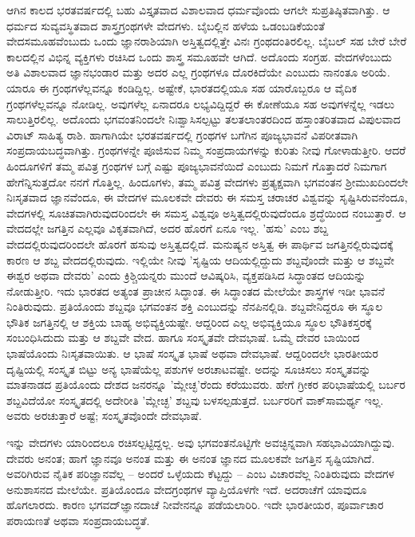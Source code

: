 ಆಗಿನ ಕಾಲದ ಭರತವರ್ಷದಲ್ಲಿ ಬಹು ವಿಸ್ತೃತವಾದ ವಿಶಾಲವಾದ ಧರ್ಮವೊಂದು ಆಗಲೇ ಸುಪ್ರತಿಷ್ಠಿತವಾಗಿತ್ತು. ಆ ಧರ್ಮದ ಸುವ್ಯವಸ್ಥಿತವಾದ ಶಾಸ್ತ್ರಗ್ರಂಥಗಳೇ ವೇದಗಳು. ಬೈಬಲ್ಲಿನ ಹಳೆಯ ಒಡಂಬಡಿಕೆಯಂತೆ ವೇದಸಮೂಹವೆಂಬುದು ಒಂದು ಜ್ಞಾನರಾಶಿಯಾಗಿ ಅಸ್ತಿತ್ವದಲ್ಲಿತ್ತೇ ವಿನಃ ಗ್ರಂಥದಂತಿರಲಿಲ್ಲ. ಬೈಬಲ್ ಸಹ ಬೇರೆ ಬೇರೆ ಕಾಲದಲ್ಲಿನ ವಿಭಿನ್ನ ವ್ಯಕ್ತಿಗಳು ರಚಿಸಿದ ಒಂದು ಶಾಸ್ತ್ರ ಸಮೂಹವೇ ಆಗಿದೆ. ಅದೊಂದು ಸಂಗ್ರಹ. ವೇದಗಳೆಂಬುದು ಅತಿ ವಿಶಾಲವಾದ ಜ್ಞಾನಭಂಡಾರ ಮತ್ತು ಅದರ ಎಲ್ಲ ಗ್ರಂಥಗಳೂ ದೊರಕಿದೆಯೇ ಎಂಬುದು ನಾನಂತೂ ಅರಿಯೆ. ಯಾರೂ ಈ ಗ್ರಂಥಗಳೆಲ್ಲವನ್ನೂ ಕಂಡಿದ್ದಿಲ್ಲ. ಅಷ್ಟೇಕೆ, ಭಾರತದಲ್ಲಿಯೂ ಸಹ ಯಾರೊಬ್ಬರೂ ಆ ವೈದಿಕ ಗ್ರಂಥಗಳೆಲ್ಲವನ್ನೂ ನೋಡಿಲ್ಲ. ಅವುಗಳೆಲ್ಲ ಏನಾದರೂ ಲಭ್ಯವಿದ್ದಿದ್ದರೆ ಈ ಕೋಣೆಯೂ ಸಹ ಅವುಗಳನ್ನೆಲ್ಲ ಇಡಲು ಸಾಲುತ್ತಿರಲಿಲ್ಲ. ಅದೊಂದು ಭಗವಂತನಿಂದಲೇ ನಿಃಶ್ವಾಸಿಸಲ್ಪಟ್ಟು ತಲತಲಾಂತರದಿಂದ ಹಸ್ತಾಂತರಿತವಾದ ವಿಪುಲವಾದ ವಿರಾಟ್ ಸಾಹಿತ್ಯ ರಾಶಿ. ಹಾಗಾಗಿಯೇ ಭರತವರ್ಷದಲ್ಲಿ ಗ್ರಂಥಗಳ ಬಗೆಗಿನ ಪೂಜ್ಯಭಾವನೆ ವಿಪರೀತವಾಗಿ ಸಂಪ್ರದಾಯಬದ್ಧವಾಗಿತ್ತು. ಗ್ರಂಥಗಳನ್ನೇ ಪೂಜಿಸುವ ನಿಮ್ಮ ಸಂಪ್ರದಾಯಗಳನ್ನು ಕುರಿತು ನೀವು ಗೋಳಾಡುತ್ತೀರಿ. ಆದರೆ ಹಿಂದೂಗಳಿಗೆ ತಮ್ಮ ಪವಿತ್ರ ಗ್ರಂಥಗಳ ಬಗ್ಗೆ ಎಷ್ಟು ಪೂಜ್ಯಭಾವನೆಯಿದೆ ಎಂಬುದು ನಿಮಗೆ ಗೊತ್ತಾದರೆ ನಿಮಗಾಗ ಹೇಗೆನ್ನಿಸುತ್ತದೋ ನನಗೆ ಗೊತ್ತಿಲ್ಲ. ಹಿಂದೂಗಳು, ತಮ್ಮ ಪವಿತ್ರ ವೇದಗಳು ಪ್ರತ್ಯಕ್ಷವಾಗಿ ಭಗವಂತನ ಶ‍್ರೀಮುಖದಿಂದಲೇ ನಿಃಸೃತವಾದ ಜ್ಞಾನವೆಂದೂ, ಈ ವೇದಗಳ ಮೂಲಕವೇ ದೇವರು ಈ ಸಮಸ್ತ ಚರಾಚರ ವಿಶ್ವವನ್ನು ಸೃಷ್ಟಿಸಿರುವನೆಂದೂ, ವೇದಗಳಲ್ಲಿ ಸೂಚಿತವಾಗಿರುವುದರಿಂದಲೇ ಈ ಸಮಸ್ತ ವಿಶ್ವವೂ ಅಸ್ತಿತ್ವದಲ್ಲಿರುವುದೆಂದೂ ಶ್ರದ್ಧೆಯಿಂದ ನಂಬುತ್ತಾರೆ. ಆ ವೇದದಲ್ಲೇ ಜಗತ್ತಿನ ಎಲ್ಲವೂ ವಿಕೃತವಾಗಿದೆ, ಅದರ ಹೊರಗೆ ಏನೂ ಇಲ್ಲ. 'ಹಸು' ಎಂಬ ಶಬ್ದ ವೇದದಲ್ಲಿರುವುದರಿಂದಲೇ ಹೊರಗೆ ಹಸುವು ಅಸ್ತಿತ್ವದಲ್ಲಿದೆ. ಮನುಷ್ಯನ ಅಸ್ತಿತ್ವ ಈ ಪಾರ್ಥಿವ ಜಗತ್ತಿನಲ್ಲಿರುವುದಕ್ಕೆ ಕಾರಣ ಆ ಶಬ್ದ ವೇದದಲ್ಲಿರುವುದು. ಇಲ್ಲಿಯೇ ನೀವು 'ಸೃಷ್ಟಿಯ ಆದಿಯಲ್ಲಿದ್ದುದು ಶಬ್ದವೊಂದೇ ಮತ್ತು ಆ ಶಬ್ದವೇ ಈಶ್ವರ ಅಥವಾ ದೇವರು' ಎಂದು ಕ್ರಿಶ್ಚಿಯನ್ನರು ಮುಂದೆ ಆವಿಷ್ಕರಿಸಿ, ವ್ಯಕ್ತಪಡಿಸಿದ ಸಿದ್ಧಾಂತದ ಆದಿಯನ್ನು ನೋಡುತ್ತೀರಿ. ಇದು ಭಾರತದ ಅತ್ಯಂತ ಪ್ರಾಚೀನ ಸಿದ್ಧಾಂತ. ಈ ಸಿದ್ಧಾಂತದ ಮೇಲೆಯೇ ಶಾಸ್ತ್ರಗಳ ಇಡೀ ಭಾವನೆ ನಿಂತಿರುವುದು. ಪ್ರತಿಯೊಂದು ಶಬ್ದವೂ ಭಗವಂತನ ಶಕ್ತಿ ಎಂಬುದನ್ನು ನೆನಪಿನಲ್ಲಿಡಿ. ಶಬ್ದವೇನಿದ್ದರೂ ಈ ಸ್ಥೂಲ ಭೌತಿಕ ಜಗತ್ತಿನಲ್ಲಿ ಆ ಶಕ್ತಿಯ ಬಾಹ್ಯ ಅಭಿವ್ಯಕ್ತಿಯಷ್ಟೇ. ಆದ್ದರಿಂದ ಎಲ್ಲ ಅಭಿವ್ಯಕ್ತಿಯೂ ಸ್ಥೂಲ ಭೌತಿಕಸ್ತರಕ್ಕೆ ಸಂಬಂಧಿಸಿದುದು ಮತ್ತು ಆ ಶಬ್ದವೇ ವೇದ. ಹಾಗೂ ಸಂಸ್ಕೃತವೇ ದೇವಭಾಷೆ. ಒಮ್ಮೆ ದೇವರ ಬಾಯಿಂದ ಭಾಷೆಯೊಂದು ನಿಃಸೃತವಾಯಿತು. ಆ ಭಾಷೆ ಸಂಸ್ಕೃತ ಭಾಷೆ ಅಥವಾ ದೇವಭಾಷೆ. ಆದ್ದರಿಂದಲೇ ಭಾರತೀಯರ ದೃಷ್ಟಿಯಲ್ಲಿ ಸಂಸ್ಕೃತ ಬಿಟ್ಟು ಅನ್ಯ ಭಾಷೆಯೆಲ್ಲ ಪಶುಗಳ ಅರಚಾಟವಷ್ಟೇ. ಅದನ್ನು ಸೂಚಿಸಲು ಸಂಸ್ಕೃತವನ್ನು ಮಾತನಾಡದ ಪ್ರತಿಯೊಂದು ದೇಶದ ಜನರನ್ನೂ 'ಮ್ಲೇಚ್ಛ'ರೆಂದು ಕರೆಯುವರು. ಹೇಗೆ ಗ್ರೀಕರ ಪರಿಭಾಷೆಯಲ್ಲಿ ಬರ್ಬರ ಶಬ್ದವಿದೆಯೋ ಸಂಸ್ಕೃತದಲ್ಲಿ ಅದೇರೀತಿ 'ಮ್ಲೇಚ್ಛ' ಶಬ್ದವು ಬಳಸಲ್ಪಡುತ್ತದೆ. ಬರ್ಬರರಿಗೆ ವಾಕ್‌ಸಾಮರ್ಥ್ಯ ಇಲ್ಲ. ಅವರು ಅರಚುತ್ತಾರೆ ಅಷ್ಟೆ; ಸಂಸ್ಕೃತವೊಂದೇ ದೇವಭಾಷೆ.

ಇನ್ನು ವೇದಗಳು ಯಾರಿಂದಲೂ ರಚಿಸಲ್ಪಟ್ಟಿದ್ದಲ್ಲ. ಅವು ಭಗವಂತನೊಟ್ಟಿಗೇ ಅವಚ್ಛಿನ್ನವಾಗಿ ಸಹಭಾವಿಯಾಗಿದ್ದುವು. ದೇವರು ಅನಂತ; ಹಾಗೆ ಜ್ಞಾನವೂ ಅನಂತ ಮತ್ತು ಈ ಅನಂತ ಜ್ಞಾನದ ಮೂಲಕವೇ ಜಗತ್ತಿನ ಸೃಷ್ಟಿಯಾಗಿದೆ. ಅವರಿಗಿರುವ ನೈತಿಕ ಪರಿಜ್ಞಾನವೆಲ್ಲ – ಅಂದರೆ ಒಳ್ಳೆಯದು ಕೆಟ್ಟದ್ದು – ಎಂಬ ವಿಚಾರವೆಲ್ಲ ನಿಂತಿರುವುದು ವೇದಗಳ ಅನುಶಾಸನದ ಮೇಲೆಯೇ. ಪ್ರತಿಯೊಂದೂ ವೇದಗ್ರಂಥಗಳ ವ್ಯಾಪ್ತಿಯೊಳಗೇ ಇದೆ. ಅದರಾಚೆಗೆ ಯಾವುದೂ ಹೊಗಲಾರದು. ಕಾರಣ ಭಗವದ್‌ಜ್ಞಾನದಾಚೆ ನೀವೇನನ್ನೂ ಪಡೆಯಲಾರಿರಿ. ಇದೇ ಭಾರತೀಯರ, ಪೂರ್ವಾಚಾರ ಪರಾಯಣತೆ ಅಥವಾ ಸಂಪ್ರದಾಯಬದ್ಧತೆ.

